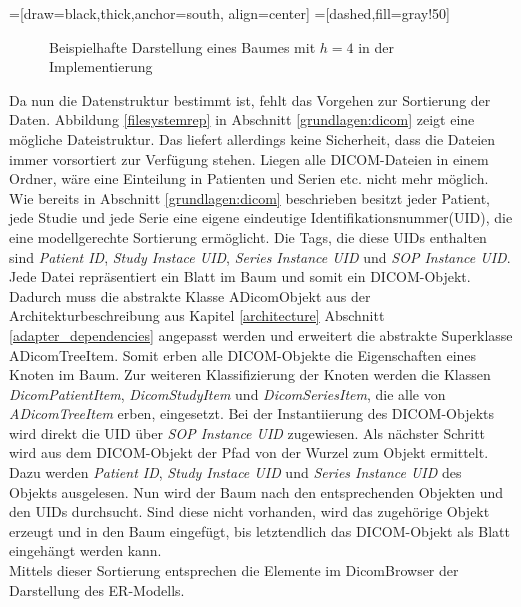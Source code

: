=[draw=black,thick,anchor=south, align=center]
=[dashed,fill=gray!50]
\begin{figure}[htbp]
\centering
\caption{Beispielhafte Darstellung eines Baumes mit $h = 4$ in der Implementierung}
\label{treeexample}
\end{figure}

Da nun die Datenstruktur bestimmt ist, fehlt das Vorgehen zur Sortierung der Daten. Abbildung \ref{filesystemrep} in Abschnitt \ref{grundlagen:dicom} zeigt eine mögliche Dateistruktur. Das liefert allerdings keine Sicherheit, dass die Dateien immer vorsortiert zur Verfügung stehen. Liegen alle DICOM-Dateien in einem Ordner, wäre eine Einteilung in Patienten und Serien etc. nicht mehr möglich.\\
Wie bereits in Abschnitt \ref{grundlagen:dicom} beschrieben besitzt jeder Patient, jede Studie und jede Serie eine eigene eindeutige Identifikationsnummer(UID), die eine modellgerechte Sortierung ermöglicht. Die Tags, die diese UIDs enthalten sind \textit{Patient ID}, \textit{Study Instace UID}, \textit{Series Instance UID} und \textit{SOP Instance UID}.\\
Jede Datei repräsentiert ein Blatt im Baum und somit ein DICOM-Objekt. Dadurch muss die abstrakte Klasse ADicomObjekt aus der Architekturbeschreibung aus Kapitel \ref{architecture} Abschnitt \ref{adapter_dependencies} angepasst werden und erweitert die abstrakte Superklasse ADicomTreeItem. Somit erben alle DICOM-Objekte die Eigenschaften eines Knoten im Baum. Zur weiteren Klassifizierung der Knoten werden die Klassen \textit{DicomPatientItem}, \textit{DicomStudyItem} und \textit{DicomSeriesItem}, die alle von \textit{ADicomTreeItem} erben, eingesetzt.
Bei der Instantiierung des DICOM-Objekts wird direkt die UID über \textit{SOP Instance UID} zugewiesen. Als nächster Schritt wird aus dem DICOM-Objekt der Pfad von der Wurzel zum Objekt ermittelt. Dazu werden \textit{Patient ID}, \textit{Study Instace UID} und \textit{Series Instance UID} des Objekts ausgelesen. Nun wird der Baum nach den entsprechenden Objekten und den UIDs durchsucht. Sind diese nicht vorhanden, wird das zugehörige Objekt erzeugt und in den Baum eingefügt, bis letztendlich das DICOM-Objekt als Blatt eingehängt werden kann.\\
Mittels dieser Sortierung entsprechen die Elemente im DicomBrowser der Darstellung des ER-Modells.

